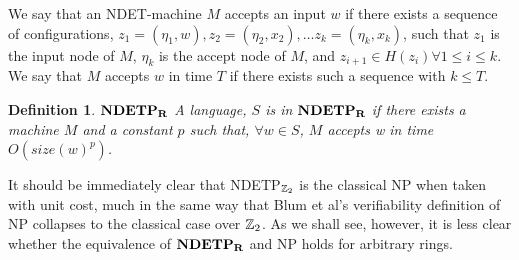 \documentclass[twoside]{article}
\newtheorem{definition}{Definition}[section]
\begin{document}
We say that an NDET-machine $M$ accepts an input $w$ if there exists a
sequence of configurations, $z_1 = (\eta_1, w), z_2 = (\eta_2, x_2),
\ldots z_k = (\eta_k, x_k)$, such that $z_1$ is the input node of $M$,
$\eta_k$ is the accept node of $M$, and $z_{i+1} \in H(z_i) \forall 1
\leq i \leq k$.  We say that $M$ accepts $w$ in time $T$ if there
exists such a sequence with $k \leq T$.

\begin{definition} $\mathbf{NDETP_R}$
  A language, $S$ is in $\mathbf{NDETP_R}$ if there exists a machine $M$ and a
  constant $p$ such that, $\forall w \in S$, $M$ accepts w in time
  $O(size(w)^p)$.
\end{definition}

It should be immediately clear that NDETP$_{\mathbb{Z}_2}$ is the
classical NP when taken with unit cost, much in the same way that Blum
et al's verifiability definition of NP collapses to the classical case
over $\mathbb{Z}_2$.  As we shall see, however, it is less clear
whether the equivalence of $\mathbf{NDETP_R}$ and NP holds for arbitrary rings.
\end{document}
